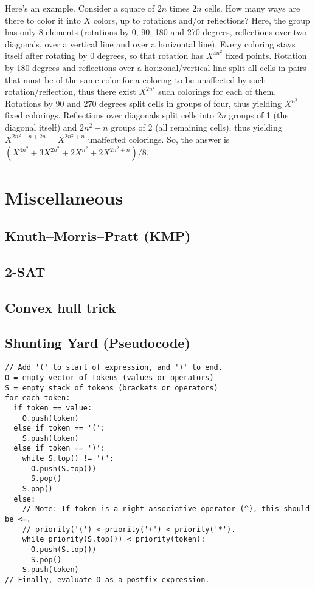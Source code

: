\documentclass[9pt]{extarticle}
\begin{document}
\begin{multicols*}{3}
Here's an example. Consider a square of $2n$ times $2n$ cells. How many ways
are there to color it into $X$ colors, up to rotations and/or reflections?
Here, the group has only 8 elements (rotations by 0, 90, 180 and 270 degrees,
reflections over two diagonals, over a vertical line and over a horizontal
line). Every coloring stays itself after rotating by 0 degrees, so that
rotation has $X^{4n^2}$ fixed points. Rotation by 180 degrees and reflections
over a horizonal/vertical line split all cells in pairs that must be of the
same color for a coloring to be unaffected by such rotation/reflection, thus
there exist $X^{2n^2}$ such colorings for each of them. Rotations by 90 and 270
degrees split cells in groups of four, thus yielding $X^{n^2}$ fixed colorings.
Reflections over diagonals split cells into $2n$ groups of 1 (the diagonal
itself) and $2n^2-n$ groups of 2 (all remaining cells), thus yielding
$X^{2n^2-n+2n}=X^{2n^2+n}$ unaffected colorings.  So, the answer is
$(X^{4n^2}+3X^{2n^2}+2X^{n^2}+2X^{2n^2+n})/8$.

\section{Miscellaneous}

\subsection{Knuth--Morris--Pratt (KMP)} %


\subsection{2-SAT} %


\subsection{Convex hull trick} %


\pagebreak

\subsection{Shunting Yard (Pseudocode)} %
\begin{lstlisting}
// Add '(' to start of expression, and ')' to end.
O = empty vector of tokens (values or operators)
S = empty stack of tokens (brackets or operators)
for each token:
  if token == value:
    O.push(token)
  else if token == '(':
    S.push(token)
  else if token == ')':
    while S.top() != '(':
      O.push(S.top())
      S.pop()
    S.pop()
  else:
    // Note: If token is a right-associative operator (^), this should be <=.
	// priority('(') < priority('+') < priority('*').
    while priority(S.top()) < priority(token):
      O.push(S.top())
      S.pop()
    S.push(token)
// Finally, evaluate O as a postfix expression.
\end{lstlisting}


\end{multicols*}
\end{document}
